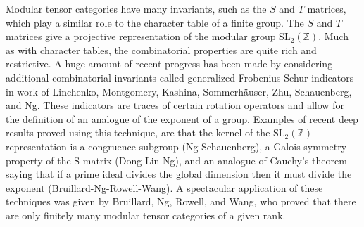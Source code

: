\documentclass[12pt]{article}
\begin{document}
Modular tensor categories have many invariants, such as the $S$ and $T$ matrices, which play a similar role to the character table of a finite group. The $S$ and $T$ matrices give a projective representation of the modular group $\mathrm{SL}_2(\mathbb{Z})$.  Much as with character tables, the combinatorial properties are quite rich and restrictive. A huge amount of recent progress has been made by considering additional combinatorial invariants called generalized Frobenius-Schur indicators in work of Linchenko, Montgomery, Kashina, Sommerh\"auser, Zhu, Schauenberg, and Ng. These indicators are traces of certain rotation operators and allow for the definition of an analogue of the exponent of a group. Examples of recent deep results proved using this technique, are that the kernel of the $\mathrm{SL}_2(\mathbb{Z})$ representation is a congruence subgroup (Ng-Schauenberg), a Galois symmetry property of the S-matrix (Dong-Lin-Ng), and an analogue of Cauchy's theorem saying that if a prime ideal divides the global dimension then it must divide the exponent (Bruillard-Ng-Rowell-Wang). A spectacular application of these techniques was given by Bruillard, Ng, Rowell, and Wang, who proved that there are only finitely many modular tensor categories of a given rank.
\end{document}
